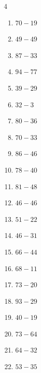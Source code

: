 \begin{multicols}{4}
\begin{enumerate}
  \item $70-19$
        \phantom{$=51$}

  \item $49-49$
        \phantom{$=0$}

  \item $87-33$
        \phantom{$=54$}

  \item $94-77$
        \phantom{$=17$}

  \item $39-29$
        \phantom{$=10$}

  \item $32-3$
        \phantom{$=29$}

  \item $80-36$
        \phantom{$=44$}

  \item $70-33$
        \phantom{$=37$}

  \item $86-46$
        \phantom{$=40$}

  \item $78-40$
        \phantom{$=38$}

  \item $81-48$
        \phantom{$=33$}

  \item $46-46$
        \phantom{$=0$}

  \item $51-22$
        \phantom{$=29$}

  \item $46-31$
        \phantom{$=15$}

  \item $66-44$
        \phantom{$=22$}

  \item $68-11$
        \phantom{$=57$}

  \item $73-20$
        \phantom{$=53$}

  \item $93-29$
        \phantom{$=64$}

  \item $40-19$
        \phantom{$=21$}

  \item $73-64$
        \phantom{$=9$}

  \item $64-32$
        \phantom{$=32$}

  \item $53-35$
        \phantom{$=18$}


\end{enumerate}
\end{multicols}
